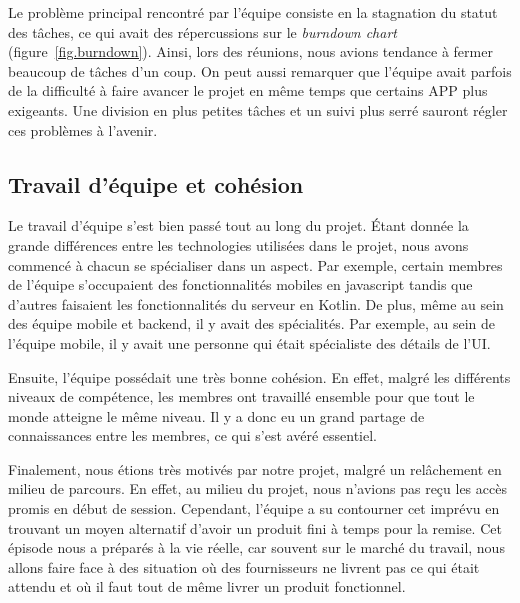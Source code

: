     Le problème principal rencontré par l'équipe consiste en la stagnation du statut des tâches, ce qui avait des répercussions sur le \emph{burndown chart} (figure~\ref{fig.burndown}). Ainsi, lors des réunions, nous avions tendance à fermer beaucoup de tâches d'un coup. On peut aussi remarquer que l'équipe avait parfois de la difficulté à faire avancer le projet en même temps que certains APP plus exigeants. Une division en plus petites tâches et un suivi plus serré sauront régler ces problèmes à l'avenir.

    \subsection{Travail d'équipe et cohésion}
    Le travail d'équipe s'est bien passé tout au long du projet. Étant donnée la grande différences entre les technologies utilisées dans le projet, nous avons commencé à chacun se spécialiser dans un aspect. Par exemple, certain membres de l'équipe s'occupaient des fonctionnalités mobiles en javascript tandis que d'autres faisaient les fonctionnalités du serveur en Kotlin. De plus, même au sein des équipe mobile et backend, il y avait des spécialités. Par exemple, au sein de l'équipe mobile, il y avait une personne qui était spécialiste des détails de l'UI.

    Ensuite, l'équipe possédait une très bonne cohésion. En effet, malgré les différents niveaux de compétence, les membres ont travaillé ensemble pour que tout le monde atteigne le même niveau. Il y a donc eu un grand partage de connaissances entre les membres, ce qui s'est avéré essentiel.

    Finalement, nous étions très motivés par notre projet, malgré un relâchement en milieu de parcours. En effet, au milieu du projet, nous n'avions pas reçu les accès promis en début de session. Cependant, l'équipe a su contourner cet imprévu en trouvant un moyen alternatif d'avoir un produit fini à temps pour la remise. Cet épisode nous a préparés à la vie réelle, car souvent sur le marché du travail, nous allons faire face à des situation où des fournisseurs ne livrent pas ce qui était attendu et où il faut tout de même livrer un produit fonctionnel.
    